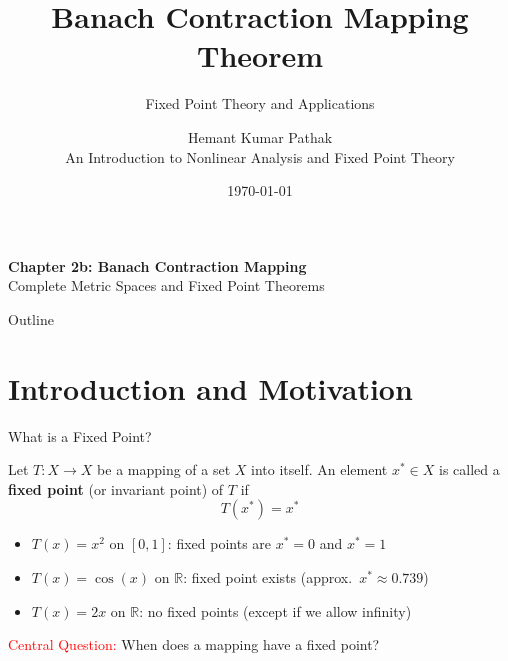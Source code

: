 \documentclass[aspectratio=169,10pt]{beamer}
\title[Banach Contraction Mapping]{Banach Contraction Mapping Theorem}
\subtitle{Fixed Point Theory and Applications}
\author[Pathak]{Hemant Kumar Pathak\\An Introduction to Nonlinear Analysis and Fixed Point Theory}
\date{\today}
\institute{Lecture Notes on Nonlinear Analysis}
\begin{document}
\begin{frame}
    \titlepage
    \vspace{0.5cm}
    \begin{center}
        \textbf{Chapter 2b: Banach Contraction Mapping}\\
        Complete Metric Spaces and Fixed Point Theorems
    \end{center}
\end{frame}

\begin{frame}[allowframebreaks]{Outline}
    \tableofcontents
\end{frame}

\section{Introduction and Motivation}

\begin{frame}{What is a Fixed Point?}
    \begin{definition}
        Let $T: X \to X$ be a mapping of a set $X$ into itself. An element $x^* \in X$ is called a \textbf{fixed point} (or invariant point) of $T$ if
        \[
            T(x^*) = x^*
        \]
    \end{definition}

    \vspace{0.3cm}
    \begin{example}
        \begin{itemize}
            \item $T(x) = x^2$ on $[0,1]$: fixed points are $x^* = 0$ and $x^* = 1$
            \item $T(x) = \cos(x)$ on $\mathbb{R}$: fixed point exists (approx.~$x^* \approx 0.739$)
            \item $T(x) = 2x$ on $\mathbb{R}$: no fixed points (except if we allow infinity)
        \end{itemize}
    \end{example}

    \vspace{0.3cm}
    \begin{center}
        \textcolor{red}{Central Question:} When does a mapping have a fixed point?
    \end{center}
\end{frame}
\end{document}
